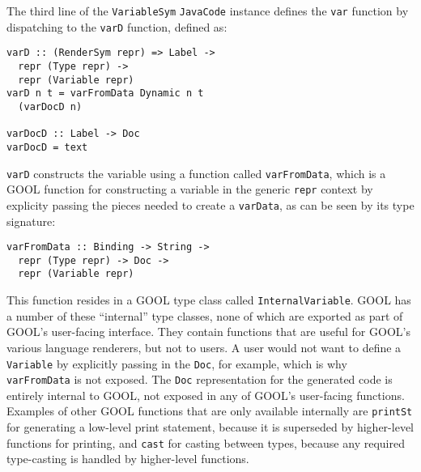 \documentclass[sigplan,review,anonymous,prologue,dvipsnames]{acmart}
\begin{document}
The third line of the \verb|VariableSym| \verb|JavaCode| instance defines the 
\verb|var| function by dispatching to the \verb|varD| function, defined as:
\begin{lstlisting}
varD :: (RenderSym repr) => Label -> 
  repr (Type repr) -> 
  repr (Variable repr)
varD n t = varFromData Dynamic n t 
  (varDocD n)

varDocD :: Label -> Doc
varDocD = text
\end{lstlisting}
\verb|varD| constructs the variable using a function called \verb|varFromData|, 
which is a GOOL function for constructing a variable in the generic \verb|repr| 
context by explicity passing the pieces needed to create a \verb|varData|, as 
can be seen by its type signature:
\begin{lstlisting}
varFromData :: Binding -> String -> 
  repr (Type repr) -> Doc -> 
  repr (Variable repr)
\end{lstlisting}
This function resides in a GOOL type class called \verb|InternalVariable|. GOOL 
has a number of these ``internal'' type classes, none of which are exported as 
part of GOOL's user-facing interface. They contain functions that are useful 
for GOOL's various language renderers, but not to users. A user would not want 
to define a \verb|Variable| by explicitly passing in the \verb|Doc|, for 
example, which is why \verb|varFromData| is not exposed. The \verb|Doc| 
representation for the generated code is entirely internal to GOOL, not exposed 
in any of GOOL's user-facing functions. Examples of other GOOL functions that 
are only available internally are \verb|printSt| for generating a low-level 
print statement, because it is superseded by higher-level functions for 
printing, and \verb|cast| for casting between types, because any required 
type-casting is handled by higher-level functions.
\end{document}
